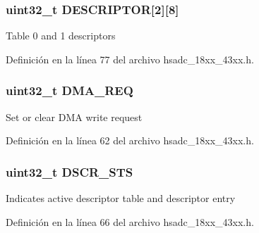 \subsubsection[{\texorpdfstring{D\+E\+S\+C\+R\+I\+P\+T\+OR}{DESCRIPTOR}}]{ uint32\+\_\+t D\+E\+S\+C\+R\+I\+P\+T\+OR\mbox{[}2\mbox{]}\mbox{[}8\mbox{]}}\hypertarget{struct_l_p_c___h_s_a_d_c___t_a8a48f3becc3cad25f2bd881b0ee03209}{}\label{struct_l_p_c___h_s_a_d_c___t_a8a48f3becc3cad25f2bd881b0ee03209}
Table 0 and 1 descriptors 

Definición en la línea 77 del archivo hsadc\+\_\+18xx\+\_\+43xx.\+h.

\subsubsection[{\texorpdfstring{D\+M\+A\+\_\+\+R\+EQ}{DMA_REQ}}]{ uint32\+\_\+t D\+M\+A\+\_\+\+R\+EQ}\hypertarget{struct_l_p_c___h_s_a_d_c___t_ad169f4e0f80023331a1f07bf82057567}{}\label{struct_l_p_c___h_s_a_d_c___t_ad169f4e0f80023331a1f07bf82057567}
Set or clear D\+MA write request 

Definición en la línea 62 del archivo hsadc\+\_\+18xx\+\_\+43xx.\+h.

\subsubsection[{\texorpdfstring{D\+S\+C\+R\+\_\+\+S\+TS}{DSCR_STS}}]{ uint32\+\_\+t D\+S\+C\+R\+\_\+\+S\+TS}\hypertarget{struct_l_p_c___h_s_a_d_c___t_a26cbdcf69ad16a1c1d49fbe2ef334a84}{}\label{struct_l_p_c___h_s_a_d_c___t_a26cbdcf69ad16a1c1d49fbe2ef334a84}
Indicates active descriptor table and descriptor entry 

Definición en la línea 66 del archivo hsadc\+\_\+18xx\+\_\+43xx.\+h.

